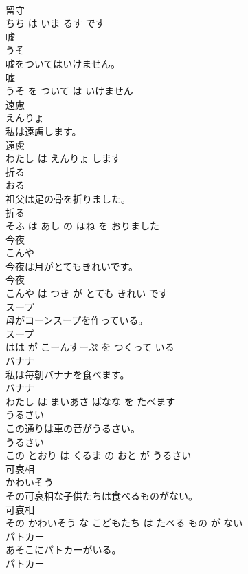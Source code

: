 \documentclass[8pt]{extreport}
\begin{document}
\begin{CJK}{UTF8}{min}
\\	留守 
\\	ちち は いま るす です			
\\	嘘	
\\	うそ			
\\	嘘をついてはいけません。	
\\	嘘 
\\	うそ を ついて は いけません			
\\	遠慮	
\\	えんりょ			
\\	私は遠慮します。	
\\	遠慮 
\\	わたし は えんりょ します			
\\	折る	
\\	おる			
\\	祖父は足の骨を折りました。	
\\	折る 
\\	そふ は あし の ほね を おりました			
\\	今夜	
\\	こんや			
\\	今夜は月がとてもきれいです。	
\\	今夜 
\\	こんや は つき が とても きれい です			
\\	スープ	
\\	母がコーンスープを作っている。	
\\	スープ 
\\	はは が こーんすーぷ を つくって いる			
\\	バナナ	
\\	私は毎朝バナナを食べます。	
\\	バナナ 
\\	わたし は まいあさ ばなな を たべます			
\\	うるさい	
\\	この通りは車の音がうるさい。	
\\	うるさい 
\\	この とおり は くるま の おと が うるさい			
\\	可哀相	
\\	かわいそう			
\\	その可哀相な子供たちは食べるものがない。	
\\	可哀相 
\\	その かわいそう な こどもたち は たべる もの が ない			
\\	パトカー	
\\	あそこにパトカーがいる。	
\\	パトカー 

\end{CJK}
\end{document}
